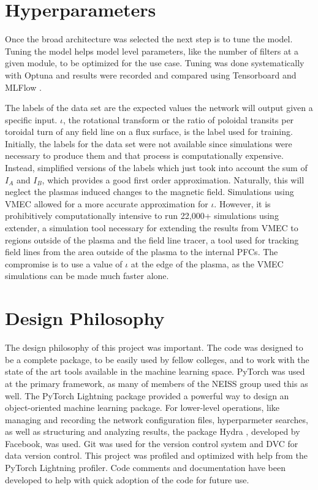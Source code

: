 \label{sec:code:hyperparameters}
\section{Hyperparameters}

Once the broad architecture was selected the next step is to tune the model. Tuning the model helps model level parameters, like the number of filters at a given module, to be optimized for the use case. Tuning was done systematically with Optuna \cite{optuna} and results were recorded and compared using Tensorboard \cite{tensorboard} and MLFlow \cite{mlflow}.

The labels of the data set are the expected values the network will output given a specific input. $\iota$, the rotational transform or the ratio of poloidal transits per toroidal turn of any field line on a flux surface, is the label used for training. Initially, the labels for the data set were not available since simulations were necessary to produce them and that process is computationally expensive. Instead, simplified versions of the labels which just took into account the sum of $I_A$ and $I_B$, which provides a good first order approximation. Naturally, this will neglect the plasmas induced changes to the magnetic field. Simulations using VMEC allowed for a more accurate approximation for $\iota$. However, it is prohibitively computationally intensive to run 22,000+ simulations using extender, a simulation tool necessary for extending the results from VMEC to regions outside of the plasma and the field line tracer, a tool used for tracking field lines from the area outside of the plasma to the internal PFCs. The compromise is to use a value of $\iota$ at the edge of the plasma, as the VMEC simulations can be made much faster alone.

\label{sec:code:philosophy}
\section{Design Philosophy}
The design philosophy of this project was important. The code was designed to be a complete package, to be easily used by fellow colleges, and to work with the state of the art tools available in the machine learning space. PyTorch \cite{pytorch} was used at the primary framework, as many of members of the NEISS group used this as well. The PyTorch Lightning \cite{pytorch_lightning} package provided a powerful way to design an object-oriented machine learning package. For lower-level operations, like managing and recording the network configuration files, hyperparmeter searches, as well as structuring and analyzing results, the package Hydra \cite{hydra}, developed by Facebook, was used. Git \cite{git} was used for the version control system and DVC \cite{dvc} for data version control. This project was profiled and optimized with help from the PyTorch Lightning profiler. Code comments and documentation have been developed to help with quick adoption of the code for future use.

